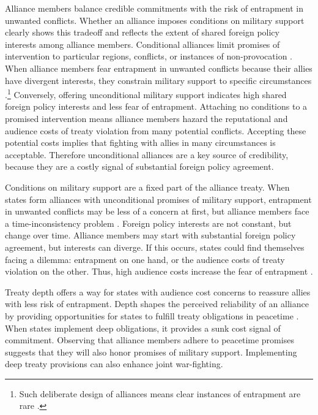 \documentclass[12pt]{article}
\begin{document}
Alliance members balance credible commitments with the risk of entrapment in unwanted conflicts. 
Whether an alliance imposes conditions on military support clearly shows this tradeoff and reflects the extent of shared foreign policy interests among alliance members. 
Conditional alliances limit promises of intervention to particular regions, conflicts, or instances of non-provocation \citep{Leedsetal2000}. 
When alliance members fear entrapment in unwanted conflicts because their allies have divergent interests, they constrain military support to specific circumstances \citep{Kim2011, Benson2012}.\footnote{Such deliberate design of alliances means clear instances of entrapment are rare \citep{Kim2011, Beckley2015}.} 
Conversely, offering unconditional military support indicates high shared foreign policy interests and less fear of entrapment. 
Attaching no conditions to a promised intervention means alliance members hazard the reputational \citep{Gibler2008, Crescenzietal2012} and audience \citep{Fearon1997} costs of treaty violation from many potential conflicts. 
Accepting these potential costs implies that fighting with allies in many circumstances is acceptable.
Therefore unconditional alliances are a key source of credibility, because they are a costly signal of substantial foreign policy agreement. 


Conditions on military support are a fixed part of the alliance treaty. 
When states form alliances with unconditional promises of military support, entrapment in unwanted conflicts may be less of a concern at first, but alliance members face a time-inconsistency problem \citep{LeedsSavun2007}. 
Foreign policy interests are not constant, but change over time. 
Alliance members may start with substantial foreign policy agreement, but interests can diverge.
If this occurs, states could find themselves facing a dilemma: entrapment on one hand, or the audience costs of treaty violation on the other.  
Thus, high audience costs increase the fear of entrapment \citep{Chibaetal2015}. 


Treaty depth offers a way for states with audience cost concerns to reassure allies with less risk of entrapment. 
Depth shapes the perceived reliability of an alliance by providing opportunities for states to fulfill treaty obligations in peacetime \citep{Morrow1994}. 
When states implement deep obligations, it provides a sunk cost signal of commitment.
Observing that alliance members adhere to peacetime promises suggests that they will also honor promises of military support. 
Implementing deep treaty provisions can also enhance joint war-fighting.
\end{document}
